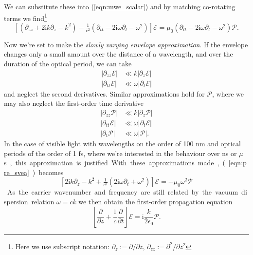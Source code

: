     We can substitute these into (\ref{eqn:mwe_scalar}) and by matching
    co-rotating terms we find\footnote{Here we use subscript notation: $\partial_{z} := \partial/\partial z$, $\partial_{zz} := \partial^2/\partial z^2$ \etc}
    \begin{equation}
    \left[ ( \partial_{zz} + 2 \mathrm{i} k \partial_{z} - k^2 ) - 
      \tfrac{1}{c^2} (\partial_{tt} - 
      2 \mathrm{i} \omega \partial_{t} - \omega^2 ) \right] \mathcal{E} = 
      \mu_0 (\partial_{tt} - 2 \mathrm{i} \omega \partial_{t} - 
      \omega^2) \mathcal{P}.
    \label{eqn:pre_svea}
    \end{equation}

    Now we're set to make the \textit{slowly varying envelope
    approximation}.\cite{lambropoulos2007fundamentals} If the envelope changes
    only a small amount over the distance of a wavelength, and over the duration
    of the optical period, we can take
    \begin{align*}
    \lvert \partial_{zz} \mathcal{E} \rvert &\ll k \lvert \partial_{z} 
        \mathcal{E} \rvert\\
    \lvert \partial_{tt} \mathcal{E} \rvert &\ll \omega \lvert \partial_{t} 
        \mathcal{E} \rvert
    \end{align*}
    and neglect the second derivatives. Similar approximations hold for
    $\mathcal{P}$, where we may also neglect the first-order time derivative
    \begin{align*}
      \lvert \partial_{zz} \mathcal{P} \rvert &\ll 
        k \lvert \partial_{z} \mathcal{P} \rvert \\
      \lvert \partial_{tt} \mathcal{E} \rvert &\ll 
        \omega \lvert \partial_{t} \mathcal{E} \rvert \\
      \lvert \partial_{t} \mathcal{P} \rvert &\ll 
        \omega \lvert \mathcal{P} \rvert.
    \end{align*}
    In the case of visible light with wavelengths on the order of 100 nm and
    optical periods of the order of 1 fs, where we're interested in the
    behaviour over \unit{ns} or \unit{$\mu$s}, this approximation is justified.

    With these approximations made, (\ref{eqn:pre_svea}) becomes
    \begin{equation}
      \left[ 2 \mathrm{i} k \partial_z - k^2 + \tfrac{1}{c^2} 
      (2 \mathrm{i} \omega \partial_t + \omega^2 ) \right] \mathcal{E} = 
      -\mu_0 \omega^2 \mathcal{P}
    \end{equation}
    As the carrier wavenumber and frequency are still related by the vacuum
    dispersion relation $\omega = c k$ we then obtain the first-order
    propagation equation
    \begin{equation}
      \label{eqn:fo_mwe}
      \left[ \frac{\partial}{\partial z} + \frac{1}{c} 
      \frac{\partial}{\partial t} \right] \mathcal{E} = 
      \mathrm{i} \frac{k}{2 \epsilon_0} \mathcal{P}.
    \end{equation}

